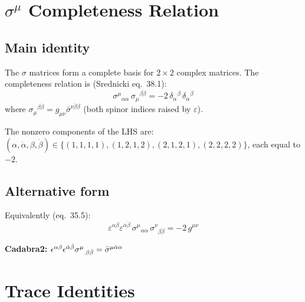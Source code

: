 \section{\texorpdfstring{$\sigma^\mu$}{sigma} Completeness Relation}

\subsection{Main identity}

The $\sigma$ matrices form a complete basis for $2\times2$ complex matrices.
The completeness relation is (Srednicki eq.~38.1):
\begin{equation}
  \boxed{
    \sigma^\mu{}_{\alpha\dot\alpha}\,\sigma_\mu{}^{\beta\dot\beta}
    = -2\,\delta_\alpha{}^\beta\,\delta_{\dot\alpha}{}^{\dot\beta}
  }
  \tag{38.1}
\end{equation}
where $\sigma_\mu{}^{\beta\dot\beta} = g_{\mu\nu}\bar\sigma^{\nu\dot\beta\beta}$
(both spinor indices raised by $\varepsilon$).


\medskip
The nonzero components of the LHS are:
$(\alpha,\dot\alpha,\beta,\dot\beta) \in
\{(1,1,1,1),(1,2,1,2),(2,1,2,1),(2,2,2,2)\}$, each equal to $-2$.

\subsection{Alternative form}

Equivalently (eq.~35.5):
\begin{equation}
  \varepsilon^{\alpha\beta}\varepsilon^{\dot\alpha\dot\beta}\,
  \sigma^\mu{}_{\alpha\dot\alpha}\,\sigma^\nu{}_{\beta\dot\beta}
  = -2\,g^{\mu\nu}
  \tag{35.5}
\end{equation}

\textbf{Cadabra2:} $\epsilon^{\alpha \beta} \epsilon^{\dot{\alpha} \dot{\beta}} \sigma^{\mu}\,_{\beta \dot{\beta}} = \bar\sigma^{\mu\dot\alpha\alpha}$


\section{Trace Identities}

